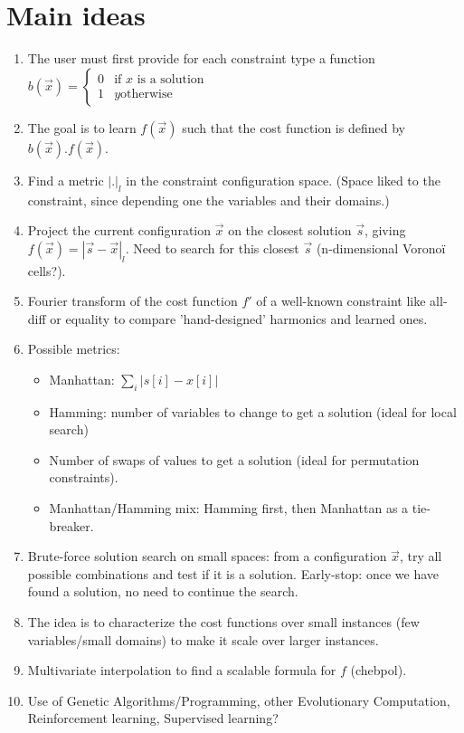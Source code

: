 \documentclass[a4paper, 12pt]{article}
\begin{document}
\section{Main ideas}
\begin{enumerate}
\item The user must first provide for each constraint type a function $b(\vec{x}) = \left\{
  \begin{array}{rl}
    0 & \text{if } x \text{ is a solution}\\
    1 & y\text{otherwise}
  \end{array} \right.$
\item The goal is to learn $f(\vec x)$ such that the cost function is defined by $b(\vec x) . f(\vec x)$.

\item Find a metric $|.|_l$ in the constraint configuration space. (\danger Space liked to the constraint, since depending one the variables and their domains.)
\item Project the current configuration $\vec{x}$ on the closest solution $\vec{s}$, giving $f(\vec x) = |\vec{s}-\vec{x}|_l$. Need to search for this closest $\vec{s}$ (n-dimensional Voronoï cells?).
\item Fourier transform of the cost function $f'$ of a well-known constraint like all-diff or equality to compare 'hand-designed' harmonics and learned ones.
\item Possible metrics:
  \begin{itemize}
  \item Manhattan: $\sum\limits_i |s[i] - x[i]|$
  \item Hamming: number of variables to change to get a solution (ideal for local search)
  \item Number of swaps of values to get a solution (ideal for permutation constraints).
  \item Manhattan/Hamming mix: Hamming first, then Manhattan as a tie-breaker.
  \end{itemize}
\item Brute-force solution search on small spaces: from a configuration $\vec{x}$, try all possible combinations and test if it is a solution. Early-stop: once we have found a solution, no need to continue the search.
\item The idea is to characterize the cost functions over small instances (few variables/small domains) to make it scale over larger instances.
\item Multivariate interpolation to find a scalable formula for $f$ (chebpol).
\item Use of Genetic Algorithms/Programming, other Evolutionary Computation, Reinforcement learning, Supervised learning?
\end{enumerate}
\end{document}
